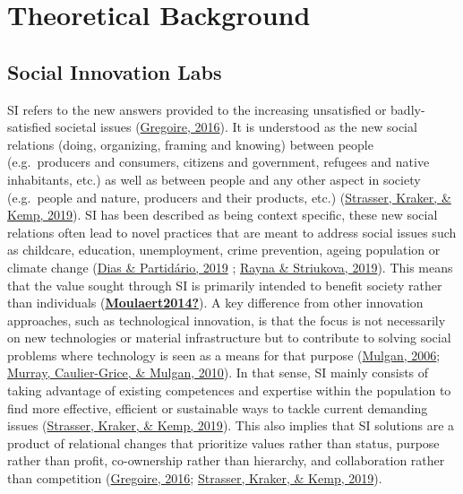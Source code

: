\documentclass[]{elsarticle} %
\begin{document}
\hypertarget{theoretical-background}{%
\section{Theoretical Background}\label{theoretical-background}}

\hypertarget{social-innovation-labs}{%
\subsection{Social Innovation Labs}\label{social-innovation-labs}}

SI refers to the new answers provided to the increasing unsatisfied or
badly-satisfied societal issues
(\protect\hyperlink{ref-Gregoire2016}{Gregoire, 2016}). It is understood
as the new social relations (doing, organizing, framing and knowing)
between people (e.g.~producers and consumers, citizens and government,
refugees and native inhabitants, etc.) as well as between people and any
other aspect in society (e.g.~people and nature, producers and their
products, etc.) (\protect\hyperlink{ref-Strasser2019}{Strasser, Kraker,
\& Kemp, 2019}). SI has been described as being context specific, these
new social relations often lead to novel practices that are meant to
address social issues such as childcare, education, unemployment, crime
prevention, ageing population or climate change
(\protect\hyperlink{ref-Dias2019}{Dias \& Partidário, 2019} ;
\protect\hyperlink{ref-Rayna2019}{Rayna \& Striukova, 2019}). This means
that the value sought through SI is primarily intended to benefit
society rather than individuals
(\protect\hyperlink{ref-Moulaert2014}{\textbf{Moulaert2014?}}). A key
difference from other innovation approaches, such as technological
innovation, is that the focus is not necessarily on new technologies or
material infrastructure but to contribute to solving social problems
where technology is seen as a means for that purpose
(\protect\hyperlink{ref-Mulgan2006}{Mulgan, 2006};
\protect\hyperlink{ref-Murray2010}{Murray, Caulier-Grice, \& Mulgan,
2010}). In that sense, SI mainly consists of taking advantage of
existing competences and expertise within the population to find more
effective, efficient or sustainable ways to tackle current demanding
issues (\protect\hyperlink{ref-Strasser2019}{Strasser, Kraker, \& Kemp,
2019}). This also implies that SI solutions are a product of relational
changes that prioritize values rather than status, purpose rather than
profit, co-ownership rather than hierarchy, and collaboration rather
than competition (\protect\hyperlink{ref-Gregoire2016}{Gregoire, 2016};
\protect\hyperlink{ref-Strasser2019}{Strasser, Kraker, \& Kemp, 2019}).
\end{document}
